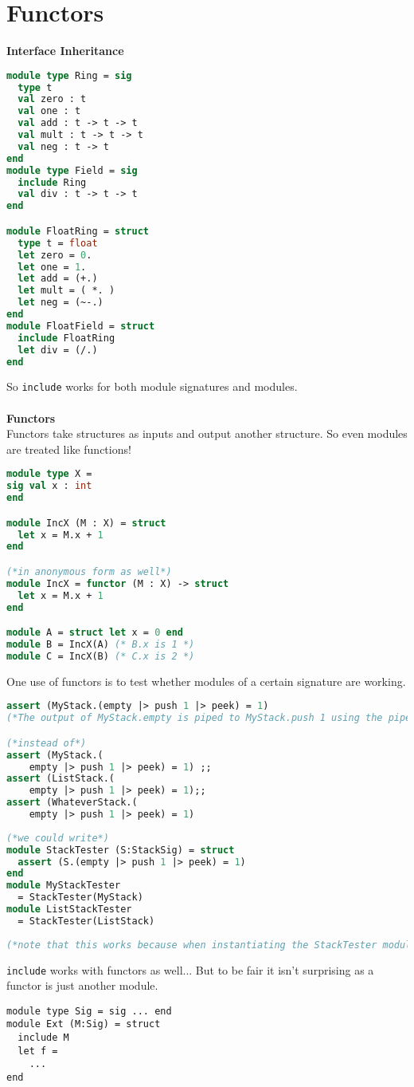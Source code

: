 \documentclass[12pt,a4paper]{article} %
\begin{document}
\section{Functors}
\textbf{Interface Inheritance}
\begin{lstlisting}[language=Caml]
module type Ring = sig
  type t
  val zero : t
  val one : t
  val add : t -> t -> t
  val mult : t -> t -> t
  val neg : t -> t
end
module type Field = sig
  include Ring
  val div : t -> t -> t
end

module FloatRing = struct
  type t = float
  let zero = 0.
  let one = 1.
  let add = (+.)
  let mult = ( *. )
  let neg = (~-.)
end
module FloatField = struct
  include FloatRing
  let div = (/.)
end
\end{lstlisting}
So \verb|include| works for both module signatures and modules.
\\\\
\textbf{Functors}
\\
Functors take structures as inputs and output another structure. So even modules are treated like functions!
\begin{lstlisting}[language=Caml]
module type X = 
sig val x : int 
end

module IncX (M : X) = struct
  let x = M.x + 1
end

(*in anonymous form as well*)
module IncX = functor (M : X) -> struct
  let x = M.x + 1
end

module A = struct let x = 0 end
module B = IncX(A) (* B.x is 1 *)
module C = IncX(B) (* C.x is 2 *)
\end{lstlisting}
One use of functors is to test whether modules of a certain signature are working.
\begin{lstlisting}[language=Caml]
assert (MyStack.(empty |> push 1 |> peek) = 1)
(*The output of MyStack.empty is piped to MyStack.push 1 using the pipe operator. Assert throws an exception if the expression evaluates to false.*)

(*instead of*)
assert (MyStack.(
    empty |> push 1 |> peek) = 1) ;;
assert (ListStack.(
    empty |> push 1 |> peek) = 1);;
assert (WhateverStack.(
    empty |> push 1 |> peek) = 1)
    
(*we could write*)
module StackTester (S:StackSig) = struct
  assert (S.(empty |> push 1 |> peek) = 1)
end
module MyStackTester
  = StackTester(MyStack)
module ListStackTester
  = StackTester(ListStack)
  
(*note that this works because when instantiating the StackTester module, it evaluates each expression within it, even if it isn't a let x = ... expression.*)
\end{lstlisting}
\verb|include| works with functors as well... But to be fair it isn't surprising as a functor is just another module.
\begin{lstlisting}[language=caml]
module type Sig = sig ... end
module Ext (M:Sig) = struct
  include M
  let f =
    ...
end
\end{lstlisting}
\end{document}
